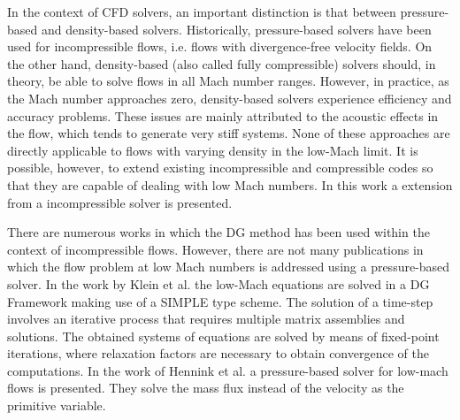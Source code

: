 In the context of CFD solvers, an important distinction is that between pressure-based and density-based solvers. Historically, pressure-based solvers have been used for incompressible flows, i.e. flows with divergence-free velocity fields. On the other hand, density-based (also called fully compressible) solvers should, in theory, be able to solve flows in all Mach number ranges. However, in practice, as the Mach number approaches zero, density-based solvers experience efficiency and accuracy problems. These issues are mainly attributed to the acoustic effects in the flow, which tends to generate very stiff systems. None of these approaches are directly applicable to flows with varying density in the low-Mach limit. \textcite{henninkPressurebasedSolverLowMach2021} It is possible, however, to extend existing incompressible and compressible codes so that they are capable of dealing with low Mach numbers. \textcite{keshtibanCompressibleFlowSolvers2003} In this work a extension from a incompressible solver is presented.

There are numerous works in which the DG method has been used within the context of incompressible flows. \textcite{shahbaziHighorderDiscontinuousGalerkin2007,kummerBoSSSDiscontinuousGalerkin2012,kleinSIMPLEBasedDiscontinuous2013,rhebergenSpaceTimeDiscontinuous2013}  However, there are not many publications in which the flow problem at low Mach numbers is addressed using a pressure-based solver. In the work by Klein et al. \textcite{kleinHighorderDiscontinuousGalerkin2016} the low-Mach equations are solved in a DG Framework making use of a SIMPLE type scheme. The solution of a time-step involves an iterative process that requires multiple matrix assemblies and solutions. The obtained systems of equations are solved by means of fixed-point iterations, where relaxation factors are necessary to obtain convergence of the computations.
In the work of Hennink et al. \textcite{henninkPressurebasedSolverLowMach2021} a pressure-based solver for low-mach flows is presented. They solve  the mass flux instead of the velocity as the primitive variable.

